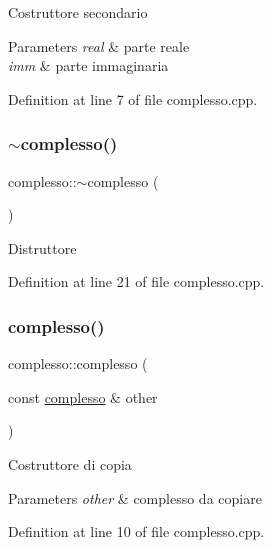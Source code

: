 Costruttore secondario


\begin{DoxyParams}{Parameters}
{\em real} & parte reale \\
\hline
{\em imm} & parte immaginaria \\
\hline
\end{DoxyParams}


Definition at line 7 of file complesso.\+cpp.

\mbox{\label{structcomplesso_a04d5503bbd98d2d0e25bec23d2b2e619}} 
\subsubsection{\texorpdfstring{$\sim$complesso()}{~complesso()}}
{\footnotesize\ttfamily complesso\+::$\sim$complesso (\begin{DoxyParamCaption}{ }\end{DoxyParamCaption})}

Distruttore 

Definition at line 21 of file complesso.\+cpp.

\mbox{\label{structcomplesso_af07bfd9970163010c92eb5bf7a150d85}} 
\subsubsection{\texorpdfstring{complesso()}{complesso()}\hspace{0.1cm}{\footnotesize\ttfamily [3/3]}}
{\footnotesize\ttfamily complesso\+::complesso (\begin{DoxyParamCaption}\item[{const \mbox{\hyperlink{structcomplesso}{complesso}} \&}]{other }\end{DoxyParamCaption})}

Costruttore di copia


\begin{DoxyParams}{Parameters}
{\em other} & complesso da copiare \\
\hline
\end{DoxyParams}


Definition at line 10 of file complesso.\+cpp.



